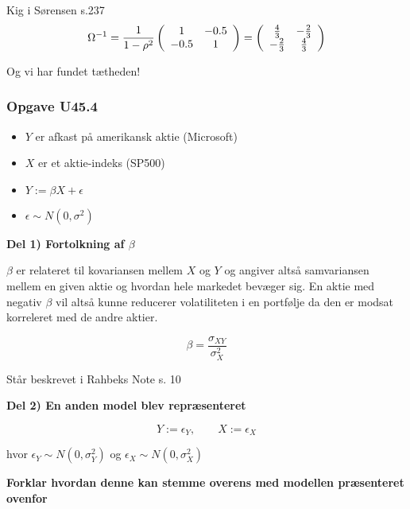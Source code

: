Kig i Sørensen s.237
\begin{equation}
    \Omega^{-1} = \frac{1}{1 -\rho^2} \left(
    \begin{array}{cc}
        1 & -0.5  \\
        -0.5 & 1
    \end{array}    
    \right) = 
    \left(
    \begin{array}{cc}
         \frac{4}{3} & -\frac{2}{3} \\
         -\frac{2}{3} & \frac{4}{3}
    \end{array} \right)
\end{equation}

Og vi har fundet tætheden!

\subsubsection{Opgave U45.4}

\begin{itemize}
    \item $Y$ er afkast på amerikansk aktie (Microsoft)
    \item $X$ er et aktie-indeks (SP500)
    \item $Y := \beta X + \epsilon$
    \item $\epsilon \sim N(0,\sigma^2)$
\end{itemize}

\textbf{Del 1) Fortolkning af $\beta$}

$\beta$ er relateret til kovariansen mellem $X$ og $Y$ og angiver altså samvariansen mellem en given aktie og hvordan hele markedet bevæger sig. En aktie med negativ $\beta$ vil altså kunne reducerer volatiliteten i en portfølje da den er modsat korreleret med de andre aktier.

\begin{equation}
    \beta = \frac{\sigma_{XY}}{\sigma^2_X}
\end{equation}

Står beskrevet i Rahbeks Note s. 10

\textbf{Del 2) En anden model blev repræsenteret}

\begin{equation}
    Y := \epsilon_Y, \qquad X := \epsilon_X
\end{equation}

hvor $\epsilon_Y \sim N(0, \sigma_Y^2)$ og $\epsilon_X \sim N(0, \sigma_X^2)$

\textbf{Forklar hvordan denne kan stemme overens med modellen præsenteret ovenfor}

